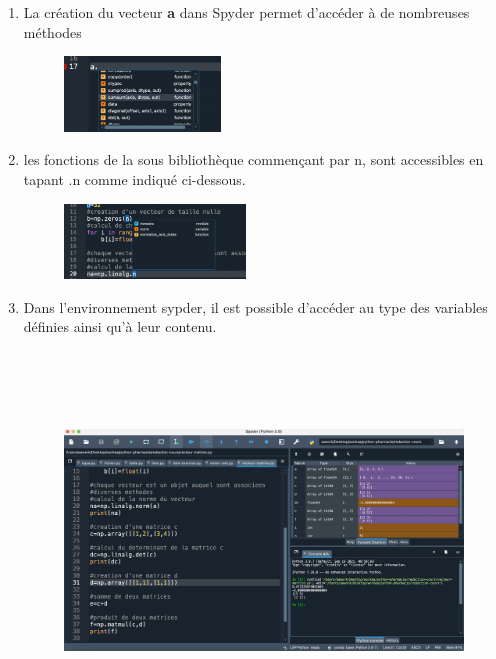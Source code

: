 \documentclass[a4paper,12pt]{article}
\begin{document}
\begin{enumerate}
\item La création du vecteur \textbf{a} dans Spyder permet d'accéder à de nombreuses méthodes
\begin{figure}[h]
\begin{center}
\includegraphics[height=2cm]{./png/methodes-vecteur.png}
\end{center}
\end{figure}
\item les fonctions de la sous bibliothèque   commençant par n, sont accessibles en tapant .n comme indiqué ci-dessous.
\begin{figure}[h]
\begin{center}
\includegraphics[height=2cm]{./png/np-linalg.png}
\end{center}
\end{figure}
\item Dans l'environnement sypder, il est possible d'accéder au type des variables définies ainsi qu'à leur contenu.
\begin{figure}[h]
\begin{center}
\includegraphics[height=10cm]{./png/vecteur-matrice.png}
\end{center}
\end{figure}
\end{enumerate}
\end{document}
